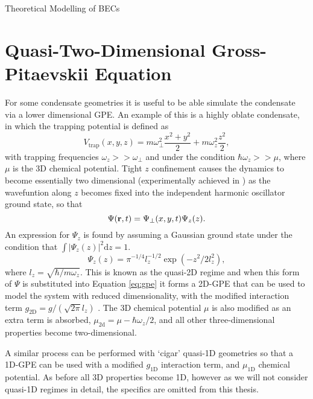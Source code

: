 \begin{chapter}{\label{cha:theoretical_model}Theoretical Modelling of BECs}
\section{\label{section:quasi2dgpe} Quasi-Two-Dimensional Gross-Pitaevskii Equation}
	For some condensate geometries it is useful to be able simulate the condensate via a lower dimensional GPE. An example of this is a highly oblate condensate, in which the trapping potential is defined as
	\begin{equation}
		V_{\mathrm{trap}}(x,y,z)=m\omega_\perp^2\frac{x^2+y^2}{2} + m\omega_z^2\frac{z^2}{2},
	\end{equation}
	with trapping frequencies $\omega_z >> \omega_\perp$ and under the condition $\hbar\omega_z >> \mu$, where $\mu$ is the 3D chemical potential. Tight $z$ confinement causes the dynamics to become essentially two dimensional (experimentally achieved in \cite{Gorlitz}) as the wavefuntion along $z$ becomes fixed into the independent harmonic oscillator ground state, so that
	\begin{equation}
		\Psi({\bf r},t) = \Psi_\perp(x,y,t) \Psi_z(z).
	\end{equation}
	An expression for $\Psi_z$ is found by assuming a Gaussian ground state under the condition that $\int |\Psi_z(z)|^2 \mathrm{d}z=1$.
	\begin{equation}
		\Psi_z(z) = \pi^{-1/4} l_z^{-1/2} \exp\left(-z^2/2l_z^2\right),
	\end{equation}
  where $l_z=\sqrt{\hbar/m \omega_z}$. This is known as the quasi-2D regime and when this form of $\Psi$ is substituted into Equation \ref{eq:gpe} it forms a 2D-GPE that can be used to model the system with reduced dimensionality, with the modified interaction term $g_{\mathrm{2D}} = g/( \sqrt{2\pi}l_z)$ \cite{parkerthesis}. The 3D chemical potential $\mu$ is also modified as an extra term is absorbed, $\mu_\mathrm{2d} = \mu - \hbar\omega_z/2$, and all other three-dimensional properties become two-dimensional.

	A similar process can be performed with `cigar' quasi-1D geometries so that a 1D-GPE can be used with a modified $g_{\mathrm{1D}}$ interaction term, and $\mu_{\mathrm{1D}}$ chemical potential. As before all 3D properties become 1D, however as we will not consider quasi-1D regimes in detail, the specifics are omitted from this thesis.



\end{chapter}
